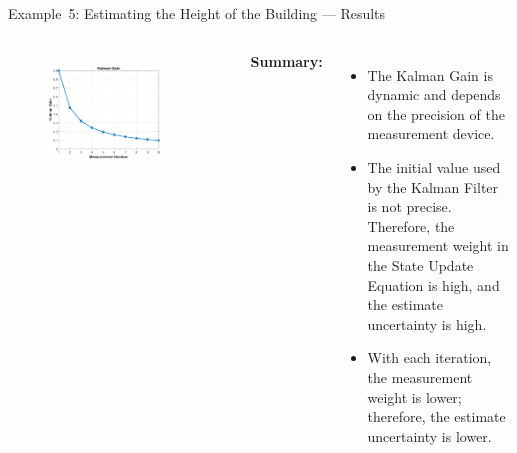 \begin{frame}{Example~5: Estimating the Height of the Building --- Results}
\begin{columns}
    \begin{figure}
	   \centering
	   \includegraphics[width=0.8\textwidth]{Figures/Chapter1/ex5_FirstKalmanFilter_KalmanGain.eps}
	   \label{fig:ex5_FirstKalmanFilter__KalmanGain}
	   \vspace{-10pt}
	\end{figure}
	
\textbf{Summary:}	
\begin{itemize}
    \item The Kalman Gain is dynamic and depends on the precision of the measurement device.
    \item The initial value used by the Kalman Filter is not precise. Therefore, the measurement weight in the State Update Equation is high, and the estimate uncertainty is high.
    \item With each iteration, the measurement weight is lower; therefore, the estimate uncertainty is lower.
\end{itemize}
	
\end{columns}    
\end{frame}

